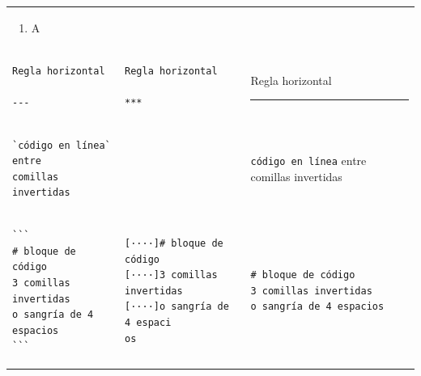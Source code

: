\documentclass[]{book}
\providecommand{\tightlist}{%
  \setlength{\itemsep}{0pt}\setlength{\parskip}{0pt}}
\theoremstyle{definition}
\theoremstyle{definition}
\theoremstyle{definition}
\theoremstyle{remark}
\begin{document}
\begin{longtable}[]{@{}lll@{}}
\begin{minipage}[t]{0.32\columnwidth}
\begin{enumerate}
  \begin{enumerate}
  \def\labelenumii{\alph{enumii}.}
  \tightlist
  \item
    A
  \end{enumerate}
\end{enumerate}\strut
\end{minipage}\tabularnewline
\begin{minipage}[t]{0.32\columnwidth}\raggedright\strut
\begin{verbatim}
Regla horizontal

---
\end{verbatim}
\strut
\end{minipage} & \begin{minipage}[t]{0.32\columnwidth}\raggedright\strut
\begin{verbatim}
Regla horizontal

***
\end{verbatim}
\strut
\end{minipage} & \begin{minipage}[t]{0.32\columnwidth}\raggedright\strut
Regla horizontal

\begin{center}\rule{0.5\linewidth}{\linethickness}\end{center}\strut
\end{minipage}\tabularnewline
\begin{minipage}[t]{0.32\columnwidth}\raggedright\strut
\begin{verbatim}
`código en línea` entre
comillas invertidas
\end{verbatim}
\strut
\end{minipage} & \begin{minipage}[t]{0.32\columnwidth}\raggedright\strut
\strut
\end{minipage} & \begin{minipage}[t]{0.32\columnwidth}\raggedright\strut
\texttt{código\ en\ línea} entre comillas invertidas\strut
\end{minipage}\tabularnewline
\begin{minipage}[t]{0.32\columnwidth}\raggedright\strut
\begin{verbatim}
```
# bloque de código
3 comillas invertidas
o sangría de 4 espacios
```
\end{verbatim}
\strut
\end{minipage} & \begin{minipage}[t]{0.32\columnwidth}\raggedright\strut
\begin{verbatim}
[····]# bloque de código
[····]3 comillas invertidas
[····]o sangría de 4 espaci
os
\end{verbatim}
\strut
\end{minipage} & \begin{minipage}[t]{0.32\columnwidth}\raggedright\strut
\begin{verbatim}
# bloque de código
3 comillas invertidas
o sangría de 4 espacios
\end{verbatim}
\strut
\end{minipage}\tabularnewline
\bottomrule
\end{longtable}
\end{document}
